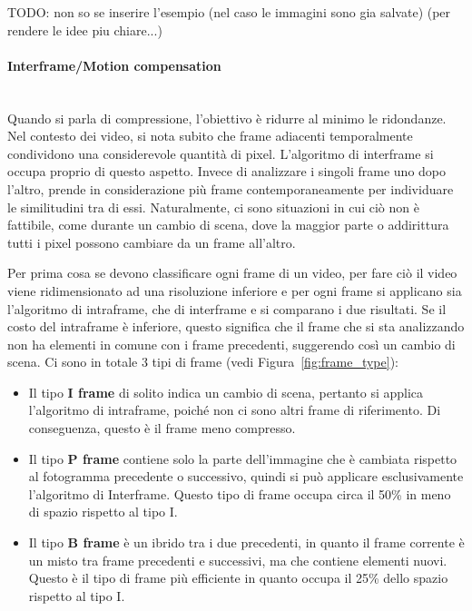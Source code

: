\documentclass[a4paper,12pt, oneside]{article}
\begin{document}
TODO: non so se inserire l'esempio (nel caso le immagini sono gia salvate) (per rendere le idee piu chiare...)

\paragraph{Interframe/Motion compensation}\hphantom{A}\\
Quando si parla di compressione, l'obiettivo è ridurre al minimo le ridondanze. Nel contesto dei video,
si nota subito che frame adiacenti temporalmente condividono una considerevole quantità di pixel.
L'algoritmo di interframe si occupa proprio di questo aspetto. Invece di analizzare i singoli frame uno
dopo l'altro, prende in considerazione più frame contemporaneamente per individuare le similitudini tra
di essi. Naturalmente, ci sono situazioni in cui ciò non è fattibile, come durante un cambio di scena,
dove la maggior parte o addirittura tutti i pixel possono cambiare da un frame all'altro.

Per prima cosa se devono classificare ogni frame di un video, per fare ciò il video viene
ridimensionato ad una risoluzione inferiore e per ogni frame si applicano sia l'algoritmo di intraframe,
che di  interframe e si comparano i due risultati. Se il costo del intraframe è inferiore, questo
significa che il frame che si sta analizzando non ha elementi in comune con i frame precedenti,
suggerendo così un cambio di scena. Ci sono in totale 3 tipi di frame (vedi Figura~\ref{fig:frame_type}):

\begin{itemize}
  \item Il tipo \textbf{I frame} di solito indica un cambio di scena, pertanto si applica l'algoritmo
  di intraframe, poiché non ci sono altri frame di riferimento. Di conseguenza, questo è il frame meno
  compresso. 
  \item Il tipo \textbf{P frame} contiene solo la parte dell'immagine che è cambiata rispetto al fotogramma
  precedente o successivo, quindi si può applicare esclusivamente l'algoritmo di Interframe. Questo tipo di
  frame occupa circa il 50\% in meno di spazio rispetto al tipo I.
  \item Il tipo \textbf{B frame} è un ibrido tra i due precedenti, in quanto il frame corrente è un misto
  tra frame precedenti e successivi, ma che contiene elementi nuovi. Questo è il tipo di frame più
  efficiente in quanto occupa il 25\% dello spazio rispetto al tipo I.
\end{itemize}
\end{document}
